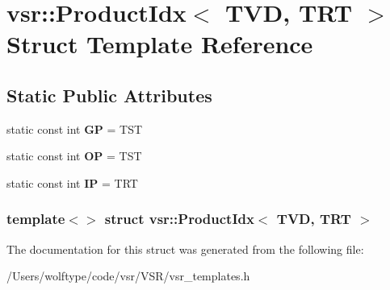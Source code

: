 \hypertarget{structvsr_1_1_product_idx_3_01_t_v_d_00_01_t_r_t_01_4}{\section{vsr\-:\-:Product\-Idx$<$ T\-V\-D, T\-R\-T $>$ Struct Template Reference}
\label{structvsr_1_1_product_idx_3_01_t_v_d_00_01_t_r_t_01_4}
}
\subsection*{Static Public Attributes}
\begin{DoxyCompactItemize}
\item 
\hypertarget{structvsr_1_1_product_idx_3_01_t_v_d_00_01_t_r_t_01_4_a5048666850396fa2081bc3281f23b121}{static const int {\bfseries G\-P} = T\-S\-T}\label{structvsr_1_1_product_idx_3_01_t_v_d_00_01_t_r_t_01_4_a5048666850396fa2081bc3281f23b121}

\item 
\hypertarget{structvsr_1_1_product_idx_3_01_t_v_d_00_01_t_r_t_01_4_ac4434683634dfa471c5b6054b07b1abf}{static const int {\bfseries O\-P} = T\-S\-T}\label{structvsr_1_1_product_idx_3_01_t_v_d_00_01_t_r_t_01_4_ac4434683634dfa471c5b6054b07b1abf}

\item 
\hypertarget{structvsr_1_1_product_idx_3_01_t_v_d_00_01_t_r_t_01_4_a837f5c6b0a09612f98dd704a7fb79afc}{static const int {\bfseries I\-P} = T\-R\-T}\label{structvsr_1_1_product_idx_3_01_t_v_d_00_01_t_r_t_01_4_a837f5c6b0a09612f98dd704a7fb79afc}

\end{DoxyCompactItemize}
\subsubsection*{template$<$$>$ struct vsr\-::\-Product\-Idx$<$ T\-V\-D, T\-R\-T $>$}



The documentation for this struct was generated from the following file\-:\begin{DoxyCompactItemize}
\item 
/\-Users/wolftype/code/vsr/\-V\-S\-R/vsr\-\_\-templates.\-h\end{DoxyCompactItemize}
